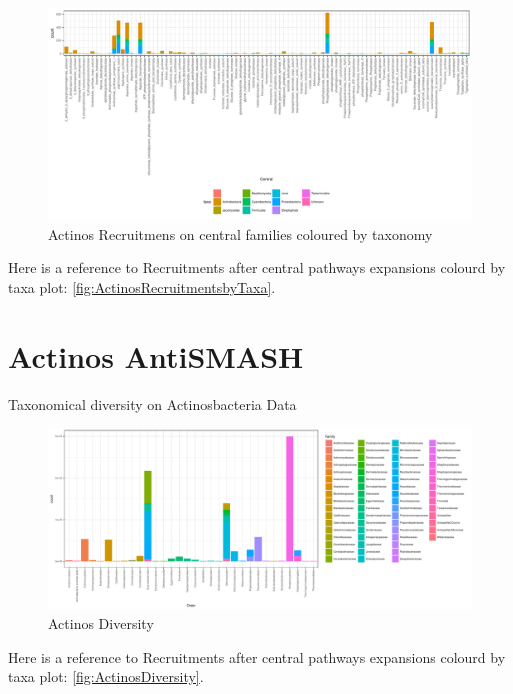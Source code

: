 \documentclass[12pt,twoside]{reedthesis}
\begin{document}
  \begin{figure}[h!tbp]
  \centering
  \includegraphics[angle = 0,scale = 0.5]{chapter4/ActinosRecruitmentsbyTaxa.pdf}
  \caption[Actinos Recruitmens on central families coloured by taxonomy]{\normalsize{Actinos Recruitmens on central families coloured by taxonomy}}
  \label{fig:ActinosRecruitmentsbyTaxa}
  \end{figure}
  
  Here is a reference to Recruitments after central pathways expansions
  colourd by taxa plot: \autoref{fig:ActinosRecruitmentsbyTaxa}.
  \clearpage 
  
  \section{Actinos AntiSMASH}\label{actinos-antismash}
  
  Taxonomical diversity on Actinosbacteria Data
  
  \begin{figure}[h!tbp]
  \centering
  \includegraphics[angle = 0,scale = 0.6]{chapter4/ActinosDiversity.pdf}
  \caption[Actinos Diversity]{\normalsize{Actinos Diversity}}
  \label{fig:ActinosDiversity}
  \end{figure}
  
  Here is a reference to Recruitments after central pathways expansions
  colourd by taxa plot: \autoref{fig:ActinosDiversity}. \clearpage
  
\end{document}
